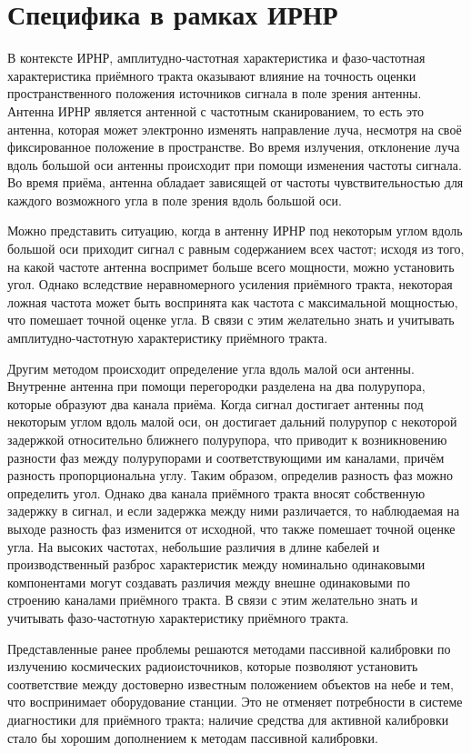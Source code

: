 \documentclass{report}
\begin{document}
\section{Специфика в рамках ИРНР}

В контексте ИРНР, амплитудно-частотная характеристика и фазо-частотная характеристика приёмного тракта оказывают влияние на точность оценки пространственного положения источников сигнала в поле зрения антенны. Антенна ИРНР является антенной с частотным сканированием, то есть это антенна, которая может электронно изменять направление луча, несмотря на своё фиксированное положение в пространстве. Во время излучения, отклонение луча вдоль большой оси антенны происходит при помощи изменения частоты сигнала. Во время приёма, антенна обладает зависящей от частоты чувствительностью для каждого возможного угла в поле зрения вдоль большой оси.

Можно представить ситуацию, когда в антенну ИРНР под некоторым углом вдоль большой оси приходит сигнал с равным содержанием всех частот; исходя из того, на какой частоте антенна воспримет больше всего мощности, можно установить угол. Однако вследствие неравномерного усиления приёмного тракта, некоторая ложная частота может быть воспринята как частота с максимальной мощностью, что помешает точной оценке угла. В связи с этим желательно знать и учитывать амплитудно-частотную характеристику приёмного тракта.

Другим методом происходит определение угла вдоль малой оси антенны. Внутренне антенна при помощи перегородки разделена на два полурупора, которые образуют два канала приёма. Когда сигнал достигает антенны под некоторым углом вдоль малой оси, он достигает дальний полурупор с некоторой задержкой относительно ближнего полурупора, что приводит к возникновению разности фаз между полурупорами и соответствующими им каналами, причём разность пропорциональна углу. Таким образом, определив разность фаз можно определить угол. Однако два канала приёмного тракта вносят собственную задержку в сигнал, и если задержка между ними различается, то наблюдаемая на выходе разность фаз изменится от исходной, что также помешает точной оценке угла. На высоких частотах, небольшие различия в длине кабелей и производственный разброс характеристик между номинально одинаковыми компонентами могут создавать различия между внешне одинаковыми по строению каналами приёмного тракта. В связи с этим желательно знать и учитывать фазо-частотную характеристику приёмного тракта.

Представленные ранее проблемы решаются методами пассивной калибровки по излучению космических радиоисточников, которые позволяют установить соответствие между достоверно известным положением объектов на небе и тем, что воспринимает оборудование станции. Это не отменяет потребности в системе диагностики для приёмного тракта; наличие средства для активной калибровки стало бы хорошим дополнением к методам пассивной калибровки.
\end{document}
